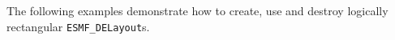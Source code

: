 
The following examples demonstrate how to create, use and destroy logically rectangular {\tt ESMF\_DELayout}s.
